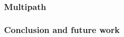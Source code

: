 \documentclass{beamer}
\begin{document}
\begin{frame}[t]
\frametitle{Multipath}

\end{frame}

\begin{frame}[t]
\frametitle{Conclusion and future work}

\end{frame}
\end{document}
